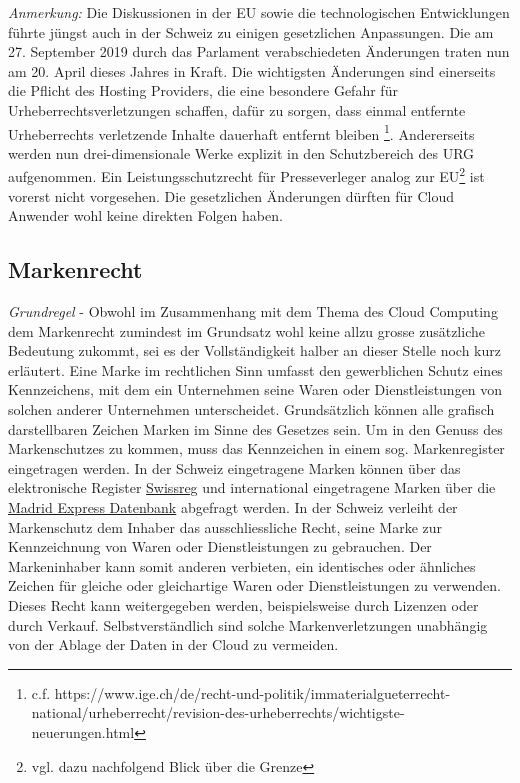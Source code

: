 \documentclass[a4paper,pointlessnumbers]{scrreprt}
\begin{document}
\textit{Anmerkung:} Die Diskussionen in der EU sowie die technologischen Entwicklungen führte jüngst auch in der Schweiz zu einigen gesetzlichen Anpassungen. Die am 27. September 2019 durch das Parlament verabschiedeten Änderungen traten nun am 20. April dieses Jahres in Kraft. Die wichtigsten Änderungen sind einerseits die Pflicht des Hosting Providers, die \glqq{}eine besondere Gefahr für Urheberrechtsverletzungen schaffen, dafür zu sorgen, dass einmal entfernte Urheberrechts verletzende Inhalte dauerhaft entfernt bleiben\grqq{} \footnote{c.f. https://www.ige.ch/de/recht-und-politik/immaterialgueterrecht-national/urheberrecht/revision-des-urheberrechts/wichtigste-neuerungen.html}. Andererseits werden nun drei-dimensionale Werke explizit in den Schutzbereich des URG aufgenommen. Ein Leistungsschutzrecht für Presseverleger analog zur EU\footnote{vgl. dazu nachfolgend Blick über die Grenze} ist vorerst nicht vorgesehen. Die gesetzlichen Änderungen dürften für Cloud Anwender wohl keine direkten Folgen haben.

\subsection{Markenrecht}
\textit{Grundregel} - Obwohl im Zusammenhang mit dem Thema des Cloud Computing dem Markenrecht zumindest im Grundsatz wohl keine allzu grosse zusätzliche Bedeutung zukommt, sei es der Vollständigkeit halber an dieser Stelle noch kurz erläutert. Eine Marke im rechtlichen Sinn umfasst den gewerblichen Schutz eines Kennzeichens, mit dem ein Unternehmen seine Waren oder Dienstleistungen von solchen anderer Unternehmen unterscheidet. Grundsätzlich können alle grafisch darstellbaren Zeichen Marken im Sinne des Gesetzes sein. Um in den Genuss des Markenschutzes zu kommen, muss das Kennzeichen in einem sog. Markenregister eingetragen werden. In der Schweiz eingetragene Marken können über das elektronische Register \href{https://www.swissreg.ch}{Swissreg} und international eingetragene Marken über die \href{http://www.wipo.int/branddb/en/}{Madrid Express Datenbank} abgefragt werden. In der Schweiz verleiht der Markenschutz dem Inhaber das ausschliessliche Recht, seine Marke zur Kennzeichnung von Waren oder Dienstleistungen zu gebrauchen. Der Markeninhaber kann somit anderen verbieten, ein identisches oder ähnliches Zeichen für gleiche oder gleichartige Waren oder Dienstleistungen zu verwenden. Dieses Recht kann weitergegeben werden, beispielsweise durch Lizenzen oder durch Verkauf. Selbstverständlich sind solche Markenverletzungen unabhängig von der Ablage der Daten in der Cloud zu vermeiden.
\end{document}
